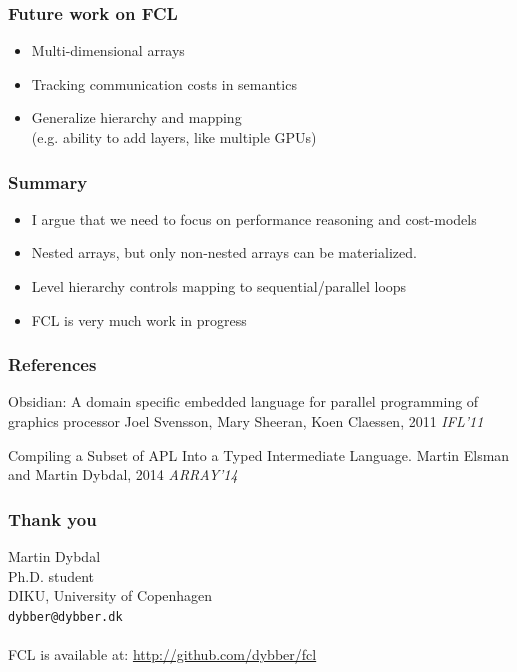 \documentclass{beamer}
\begin{document}
\begin{frame}
  \frametitle{Future work on FCL}
  \begin{itemize}
  \item Multi-dimensional arrays
  \item Tracking communication costs in semantics
  \item Generalize hierarchy and mapping \\
    {\small (e.g. ability to add layers, like multiple GPUs)}
  \end{itemize}
\end{frame}

\begin{frame}
\frametitle{Summary}

\begin{itemize}
\item I argue that we need to focus on performance reasoning and
  cost-models
\item Nested arrays, but only non-nested arrays can be materialized.
\item Level hierarchy controls mapping to sequential/parallel loops
\item FCL is very much work in progress
\end{itemize}

\end{frame}

\begin{frame}
\frametitle{References}
\footnotesize{
\begin{thebibliography}{99} %
 Obsidian: A domain specific embedded language for parallel programming of graphics processor
\newblock Joel Svensson, Mary Sheeran, Koen Claessen, 2011
\newblock \emph{IFL'11}

 Compiling a Subset of APL Into a Typed Intermediate Language.
\newblock Martin Elsman and Martin Dybdal, 2014
\newblock \emph{ARRAY'14}
\end{thebibliography}
}
\end{frame}

\begin{frame}
\frametitle{Thank you}

Martin Dybdal \\
Ph.D. student \\
DIKU, University of Copenhagen \\
\texttt{dybber@dybber.dk} \\
~\\
FCL is available at: \url{http://github.com/dybber/fcl}
\end{frame}
\end{document}
